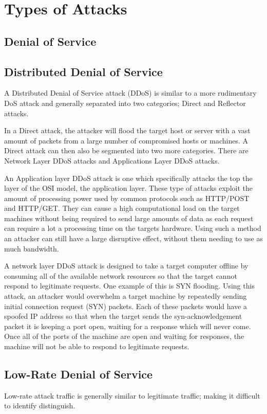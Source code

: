 \documentclass[conference, a4paper]{IEEEtran}
\begin{document}
\section{Types of Attacks}
\subsection{Denial of Service}
\subsection{Distributed Denial of Service}
    A Distributed Denial of Service attack (DDoS) is similar to a more rudimentary DoS attack and generally separated into two categories; Direct and Reflector attacks.

    In a Direct attack, the attacker will flood the target host or server with a vast amount of packets from a large number of compromised hosts or machines. 
    A Direct attack can then also be segmented into two more categories. There are Network Layer DDoS attacks and Applications Layer DDoS attacks.\cite{empirical_evaluation}
    
    An Application layer DDoS attack is one which specifically attacks the top the layer of the OSI model, the application layer.
    These type of attacks exploit the amount of processing power used by common protocols such as HTTP/POST and HTTP/GET.
    They can cause a high computational load on the target machines without being required to send large amounts of data as each request can require a lot a processing time on the targets hardware.
    Using such a method an attacker can still have a large disruptive effect, without them needing to use as much bandwidth.\cite{cloudflare_DDoS}

    A network layer DDoS attack is designed to take a target computer offline by consuming all of the available network resources so that the target cannot respond to legitimate requests.
    One example of this is SYN flooding. Using this attack, an attacker would overwhelm a target machine by repeatedly sending initial connection request (SYN) packets.
    Each of these packets would have a spoofed IP address so that when the target sends the syn-acknowledgement packet it is keeping a port open, waiting for a response which will never come.
    Once all of the ports of the machine are open and waiting for responses, the machine will not be able to respond to legitimate requests.\cite{cloudflare_syn_flood}
 
    \subsection{Low-Rate Denial of Service}
    Low-rate attack traffic is generally similar to legitimate traffic; making it difficult to identify distinguish.\cite{two_layer_approach__DDOS}
\end{document}
